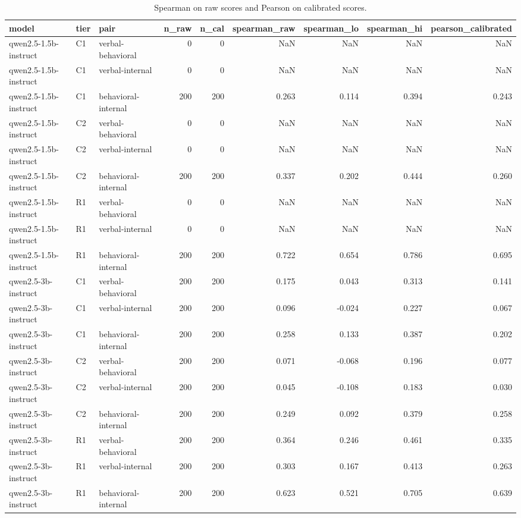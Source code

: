 \begin{table}
\caption{Spearman on raw scores and Pearson on calibrated scores.}
\label{tab:t9_signal_correlations}
\begin{tabular}{lllrrrrrr}
\toprule
model & tier & pair & n\_raw & n\_cal & spearman\_raw & spearman\_lo & spearman\_hi & pearson\_calibrated \\
\midrule
qwen2.5-1.5b-instruct & C1 & verbal-behavioral & 0 & 0 & NaN & NaN & NaN & NaN \\
qwen2.5-1.5b-instruct & C1 & verbal-internal & 0 & 0 & NaN & NaN & NaN & NaN \\
qwen2.5-1.5b-instruct & C1 & behavioral-internal & 200 & 200 & 0.263 & 0.114 & 0.394 & 0.243 \\
qwen2.5-1.5b-instruct & C2 & verbal-behavioral & 0 & 0 & NaN & NaN & NaN & NaN \\
qwen2.5-1.5b-instruct & C2 & verbal-internal & 0 & 0 & NaN & NaN & NaN & NaN \\
qwen2.5-1.5b-instruct & C2 & behavioral-internal & 200 & 200 & 0.337 & 0.202 & 0.444 & 0.260 \\
qwen2.5-1.5b-instruct & R1 & verbal-behavioral & 0 & 0 & NaN & NaN & NaN & NaN \\
qwen2.5-1.5b-instruct & R1 & verbal-internal & 0 & 0 & NaN & NaN & NaN & NaN \\
qwen2.5-1.5b-instruct & R1 & behavioral-internal & 200 & 200 & 0.722 & 0.654 & 0.786 & 0.695 \\
qwen2.5-3b-instruct & C1 & verbal-behavioral & 200 & 200 & 0.175 & 0.043 & 0.313 & 0.141 \\
qwen2.5-3b-instruct & C1 & verbal-internal & 200 & 200 & 0.096 & -0.024 & 0.227 & 0.067 \\
qwen2.5-3b-instruct & C1 & behavioral-internal & 200 & 200 & 0.258 & 0.133 & 0.387 & 0.202 \\
qwen2.5-3b-instruct & C2 & verbal-behavioral & 200 & 200 & 0.071 & -0.068 & 0.196 & 0.077 \\
qwen2.5-3b-instruct & C2 & verbal-internal & 200 & 200 & 0.045 & -0.108 & 0.183 & 0.030 \\
qwen2.5-3b-instruct & C2 & behavioral-internal & 200 & 200 & 0.249 & 0.092 & 0.379 & 0.258 \\
qwen2.5-3b-instruct & R1 & verbal-behavioral & 200 & 200 & 0.364 & 0.246 & 0.461 & 0.335 \\
qwen2.5-3b-instruct & R1 & verbal-internal & 200 & 200 & 0.303 & 0.167 & 0.413 & 0.263 \\
qwen2.5-3b-instruct & R1 & behavioral-internal & 200 & 200 & 0.623 & 0.521 & 0.705 & 0.639 \\

\end{tabular}
\end{table}
